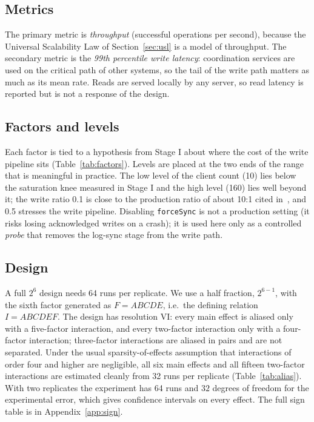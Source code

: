 \subsection{Metrics}

The primary metric is \emph{throughput} (successful operations per second), because the Universal Scalability
Law of Section~\ref{sec:usl} is a model of throughput. The secondary metric is the \emph{99th percentile write
latency}: coordination services are used on the critical path of other systems, so the tail of the write path
matters as much as its mean rate. Reads are served locally by any server, so read latency is reported but is
not a response of the design.

\subsection{Factors and levels}

Each factor is tied to a hypothesis from Stage I about where the cost of the write pipeline sits
(Table~\ref{tab:factors}). Levels are placed at the two ends of the range that is meaningful in practice.
The low level of the client count (10) lies below the saturation knee measured in Stage I and the high level
(160) lies well beyond it; the write ratio 0.1 is close to the production ratio of about 10:1
cited in~\cite{mit_6824_zookeeper}, and 0.5 stresses the write pipeline.
Disabling \texttt{forceSync} is not a production setting (it risks losing acknowledged writes on a crash); it
is used here only as a controlled \emph{probe} that removes the log-sync stage from the write path.

\begin{table}[h]
  \centering
  \caption{Factors, levels and justification. ``Hard'' factors need a reconfiguration of the ensemble.}
  \label{tab:factors}
  \footnotesize
\end{table}

\subsection{Design}

A full $2^6$ design needs 64 runs per replicate. We use a half fraction, $2^{6-1}$, with the sixth factor
generated as $F=ABCDE$, i.e.\ the defining relation $I=ABCDEF$. The design has resolution VI: every main effect
is aliased only with a five-factor interaction, and every two-factor interaction only with a four-factor
interaction; three-factor interactions are aliased in pairs and are not separated. Under the usual
sparsity-of-effects assumption that interactions of order four and higher are negligible, all six main effects
and all fifteen two-factor interactions are estimated cleanly from 32 runs per replicate
(Table~\ref{tab:alias}). With two replicates the experiment has 64 runs and $32$ degrees of freedom for the
experimental error, which gives confidence intervals on every effect. The full sign table is in
Appendix~\ref{app:sign}.


